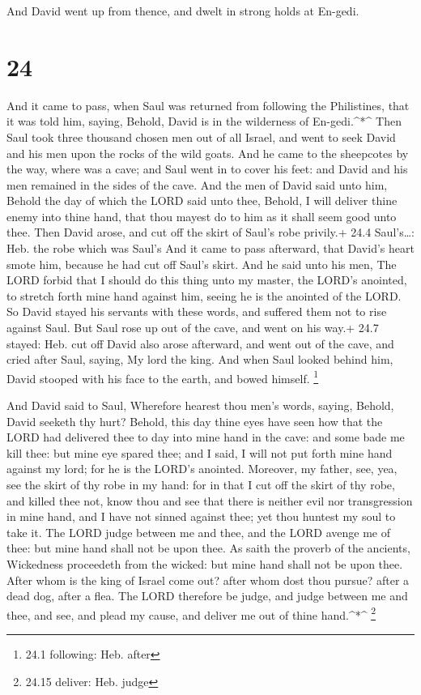  And David went up from thence, and dwelt in strong holds
at En-gedi.

\hypertarget{section-23}{%
\section{24}\label{section-23}}

 And it came to pass, when Saul was returned from following
the Philistines, that it was told him, saying, Behold, David is in the
wilderness of En-gedi.\^{}*\^{}  Then Saul took three
thousand chosen men out of all Israel, and went to seek David and his
men upon the rocks of the wild goats.  And he came to the
sheepcotes by the way, where was a cave; and Saul went in to cover his
feet: and David and his men remained in the sides of the cave.
 And the men of David said unto him, Behold the day of which
the LORD said unto thee, Behold, I will deliver thine enemy into thine
hand, that thou mayest do to him as it shall seem good unto thee. Then
David arose, and cut off the skirt of Saul's robe privily.+ 24.4
Saul's\ldots: Heb. the robe which was Saul's  And it came to
pass afterward, that David's heart smote him, because he had cut off
Saul's skirt.  And he said unto his men, The LORD forbid
that I should do this thing unto my master, the LORD's anointed, to
stretch forth mine hand against him, seeing he is the anointed of the
LORD.  So David stayed his servants with these words, and
suffered them not to rise against Saul. But Saul rose up out of the
cave, and went on his way.+ 24.7 stayed: Heb. cut off  David
also arose afterward, and went out of the cave, and cried after Saul,
saying, My lord the king. And when Saul looked behind him, David stooped
with his face to the earth, and bowed himself. \footnote{24.1 following:
  Heb. after}

 And David said to Saul, Wherefore hearest thou men's words,
saying, Behold, David seeketh thy hurt?  Behold, this day
thine eyes have seen how that the LORD had delivered thee to day into
mine hand in the cave: and some bade me kill thee: but mine eye spared
thee; and I said, I will not put forth mine hand against my lord; for he
is the LORD's anointed.  Moreover, my father, see, yea, see
the skirt of thy robe in my hand: for in that I cut off the skirt of thy
robe, and killed thee not, know thou and see that there is neither evil
nor transgression in mine hand, and I have not sinned against thee; yet
thou huntest my soul to take it.  The LORD judge between me
and thee, and the LORD avenge me of thee: but mine hand shall not be
upon thee.  As saith the proverb of the ancients,
Wickedness proceedeth from the wicked: but mine hand shall not be upon
thee.  After whom is the king of Israel come out? after
whom dost thou pursue? after a dead dog, after a flea.  The
LORD therefore be judge, and judge between me and thee, and see, and
plead my cause, and deliver me out of thine hand.\^{}*\^{} \footnote{24.15
  deliver: Heb. judge}

